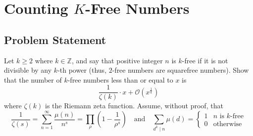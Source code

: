 
\section{Counting $K$-Free Numbers}
\subsection{Problem Statement}
Let $k \geq 2$ where $k \in \mathbb{Z}$, and say that positive integer $n$ is $k$-free if it is not divisible by any $k$-th power (thus, $2$-free numbers are squarefree numbers). Show that the number of $k$-free numbers less than or equal to $x$ is 
$$
\frac{1}{\zeta(k)} \cdot x + \mathcal{O}\left(x^{\frac{1}{k}}\right) 
$$
where $\zeta(k)$ is the Riemann zeta function. Assume, without proof, that
$$
\frac{1}{\zeta(s)} = \sum_{n=1}^\infty \frac{\mu(n)}{n^s} = \prod_{\rho} \left(1 - \frac{1}{\rho^s}\right) \quad  \text{and} \quad  \sum_{d^k \mid n} \mu(d) = \begin{cases} 1 & n \text{ is }k\text{-free}\\ 0 &\text{otherwise} \end{cases}
$$
